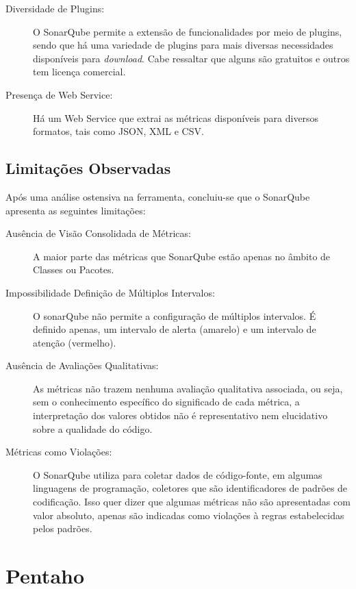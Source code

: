 \begin{description}
\item [Diversidade de Plugins:] O SonarQube permite a 
extensão de funcionalidades por meio de plugins, sendo que há uma variedade de 
plugins para mais diversas necessidades disponíveis para \textit{download}. 
Cabe ressaltar que alguns são gratuitos e outros tem licença comercial.

\item [Presença de Web Service:] Há um Web Service que extrai as métricas 
disponíveis para diversos formatos, tais como JSON, XML e CSV.

\end{description}




\subsection {Limitações Observadas}
Após uma análise ostensiva na ferramenta, concluiu-se que o SonarQube apresenta 
as seguintes limitações:

\begin{description}

\item [Ausência de Visão Consolidada de Métricas:]  A maior parte das métricas
que SonarQube estão apenas no âmbito de Classes ou Pacotes.

\item [Impossibilidade Definição de Múltiplos Intervalos:]  O sonarQube não 
permite a configuração de múltiplos intervalos. É definido apenas, um 
intervalo de alerta (amarelo) e um intervalo de atenção (vermelho).

\item [Ausência de Avaliações Qualitativas:] As métricas não trazem nenhuma 
avaliação qualitativa associada, ou seja, sem o conhecimento específico do 
significado de cada métrica, a interpretação dos valores obtidos não é 
representativo nem elucidativo sobre a qualidade do código.

\item [Métricas como Violações:] O SonarQube utiliza para coletar dados de 
código-fonte, em algumas linguagens de programação, coletores que são 
identificadores de padrões de codificação. Isso quer dizer que algumas métricas 
não são apresentadas com valor absoluto, apenas são indicadas como violações à 
regras estabelecidas pelos padrões. 

\end{description}



\section{Pentaho}

